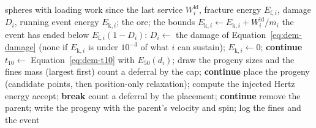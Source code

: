 \begin{algorithm}[!t]
\caption{One breakage service of the particle-replacement model (\texttt{crushdem.breakage}, \texttt{replacement.py}; every $50$ steps).}
\label{alg:dem-break}
\begin{algorithmic}[1]
\Require spheres with loading work since the last service $W^{\mathrm{ld}}_i$, fracture energy $E_{\mathrm f,i}$, damage $D_i$, running event energy $E_{\mathrm k,i}$; the ore; the bounds
   $E_{\mathrm k,i}\gets E_{\mathrm k,i}+W^{\mathrm{ld}}_i/m_i$ 
    \State the event has ended below $E_{\mathrm f,i}(1-D_i)$: $D_i\gets$ the damage of Equation~\eqref{eq:dem-damage} (none if $E_{\mathrm k,i}$ is under $10^{-3}$ of what $i$ can sustain); $E_{\mathrm k,i}\gets0$; \textbf{continue}
  \EndIf
    \State $t_{10}\gets$ Equation~\eqref{eq:dem-t10} with $E_{50}(d_i)$; draw the progeny sizes and the fines mass (largest first)
     \State count a deferral by the cap; \textbf{continue} \EndIf
      \State place the progeny (candidate points, then position-only relaxation); compute the injected Hertz energy
       \State accept; \textbf{break} \EndIf
    \EndFor
     \State count a deferral by the placement; \textbf{continue} \EndIf
    \State remove the parent; write the progeny with the parent's velocity and spin; log the fines and the event
  \EndIf
\EndFor
\end{algorithmic}
\end{algorithm}

